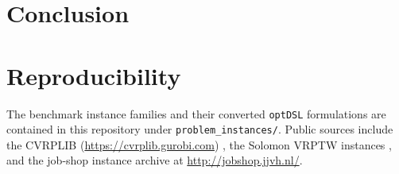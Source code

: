 \documentclass[11pt,a4paper]{article}
\begin{document}
\section{Conclusion}

\section*{Reproducibility}
The benchmark instance families and their converted \texttt{optDSL} formulations are contained in this repository under \texttt{problem\_instances/}.
Public sources include the CVRPLIB (\url{https://cvrplib.gurobi.com}) \citep{uchoa2017cvrplib}, the Solomon VRPTW instances \citep{solomon1987vrptw}, and the job-shop instance archive at \url{http://jobshop.jjvh.nl/}.



\end{document}
